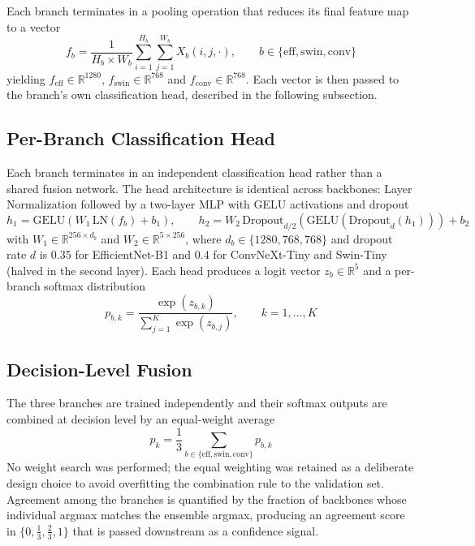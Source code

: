 \documentclass[pdflatex,sn-mathphys-num]{sn-jnl}%
\begin{document}
Each branch terminates in a pooling operation that reduces its final feature map to a vector
\begin{equation}
f_{b} = \frac{1}{H_{b} \times W_{b}} \sum_{i=1}^{H_{b}} \sum_{j=1}^{W_{b}} X_{b}(i,j,\cdot),
\qquad b \in \{\mathrm{eff}, \mathrm{swin}, \mathrm{conv}\}
\end{equation}
yielding $f_{\mathrm{eff}} \in \mathbb{R}^{1280}$, $f_{\mathrm{swin}} \in \mathbb{R}^{768}$
and $f_{\mathrm{conv}} \in \mathbb{R}^{768}$. Each vector is then passed to the branch's own
classification head, described in the following subsection.

\subsection{Per-Branch Classification Head}

Each branch terminates in an independent classification head rather than a shared fusion
network. The head architecture is identical across backbones: Layer Normalization followed by
a two-layer MLP with GELU activations and dropout
\begin{equation}
h_{1} = \mathrm{GELU}\!\left(W_{1}\, \mathrm{LN}(f_{b}) + b_{1}\right), \qquad
h_{2} = W_{2}\, \mathrm{Dropout}_{d/2}\!\left(\mathrm{GELU}\!\left(\mathrm{Dropout}_{d}(h_{1})\right)\right) + b_{2}
\end{equation}
with $W_{1} \in \mathbb{R}^{256 \times d_{b}}$ and $W_{2} \in \mathbb{R}^{5 \times 256}$,
where $d_{b} \in \{1280, 768, 768\}$ and dropout rate $d$ is 0.35 for EfficientNet-B1 and
0.4 for ConvNeXt-Tiny and Swin-Tiny (halved in the second layer). Each head produces a logit
vector $z_{b} \in \mathbb{R}^{5}$ and a per-branch softmax distribution
\begin{equation}
p_{b,k} = \frac{\exp(z_{b,k})}{\sum_{j=1}^{K} \exp(z_{b,j})}, \qquad k = 1, \ldots, K
\end{equation}

\subsection{Decision-Level Fusion}\label{sec:fusion}

The three branches are trained independently and their softmax outputs are combined at
decision level by an equal-weight average
\begin{equation}
p_{k} = \frac{1}{3}\sum_{b \in \{\mathrm{eff}, \mathrm{swin}, \mathrm{conv}\}} p_{b,k}
\end{equation}
No weight search was performed; the equal weighting was retained as a deliberate design
choice to avoid overfitting the combination rule to the validation set. Agreement among
the branches is quantified by the fraction of backbones whose individual argmax matches
the ensemble argmax, producing an agreement score in $\{0, \tfrac{1}{3}, \tfrac{2}{3}, 1\}$
that is passed downstream as a confidence signal.
\end{document}
